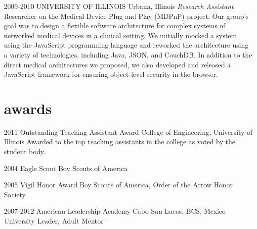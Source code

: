 \documentclass['print']{friggeri-cv} %
\begin{document}
\begin{entrylist}
\entry
{2009-2010}
{UNIVERSITY OF ILLINOIS}
{Urbana, Illinois}
{\emph{Research Assistant} \\
Researcher on the Medical Device Plug and Play (MDPnP) project. Our group's goal was to design a flexible software architecture for complex systems of networked medical devices in a clinical setting. We initially mocked a system using the JavaScript programming language and reworked the architecture using a variety of technologies, including Java, JSON, and CouchDB. In addition to the direct medical architectures we proposed, we also developed and released a JavaScript framework for ensuring object-level security in the browser.}
\end{entrylist}


\section{awards}

\begin{entrylist}
\entry
{2011}
{Outstanding Teaching Assistant Award}
{College of Engineering, University of Illinois}
{Awarded to the top teaching assistants in the college as voted by the student body.}
\end{entrylist}
\begin{entrylist}
\entry
{2004}
{Eagle Scout}
{Boy Scouts of America}
{}
\end{entrylist}
\begin{entrylist}
\entry
{2005}
{Vigil Honor Award}
{Boy Scouts of America, Order of the Arrow Honor Society}
{}
\end{entrylist}
\begin{entrylist}
\entry
{2007-2012}
{American Leadership Academy}
{Cabo San Lucas, BCS, Mexico}
{University Leader, Adult Mentor}
\end{entrylist}

\end{document}
